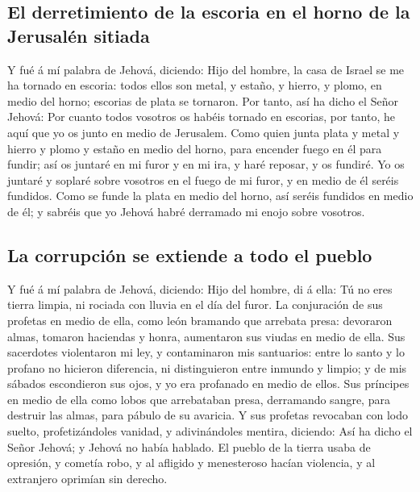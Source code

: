 \hypertarget{el-derretimiento-de-la-escoria-en-el-horno-de-la-jerusaluxe9n-sitiada}{%
\subsection{El derretimiento de la escoria en el horno de la Jerusalén
sitiada}\label{el-derretimiento-de-la-escoria-en-el-horno-de-la-jerusaluxe9n-sitiada}}

 Y fué á mí palabra de Jehová, diciendo:  Hijo
del hombre, la casa de Israel se me ha tornado en escoria: todos ellos
son metal, y estaño, y hierro, y plomo, en medio del horno; escorias de
plata se tornaron.  Por tanto, así ha dicho el Señor
Jehová: Por cuanto todos vosotros os habéis tornado en escorias, por
tanto, he aquí que yo os junto en medio de Jerusalem.  Como
quien junta plata y metal y hierro y plomo y estaño en medio del horno,
para encender fuego en él para fundir; así os juntaré en mi furor y en
mi ira, y haré reposar, y os fundiré.  Yo os juntaré y
soplaré sobre vosotros en el fuego de mi furor, y en medio de él seréis
fundidos.  Como se funde la plata en medio del horno, así
seréis fundidos en medio de él; y sabréis que yo Jehová habré derramado
mi enojo sobre vosotros.

\hypertarget{la-corrupciuxf3n-se-extiende-a-todo-el-pueblo}{%
\subsection{La corrupción se extiende a todo el
pueblo}\label{la-corrupciuxf3n-se-extiende-a-todo-el-pueblo}}

 Y fué á mí palabra de Jehová, diciendo:  Hijo
del hombre, di á ella: Tú no eres tierra limpia, ni rociada con lluvia
en el día del furor.  La conjuración de sus profetas en
medio de ella, como león bramando que arrebata presa: devoraron almas,
tomaron haciendas y honra, aumentaron sus viudas en medio de ella.
 Sus sacerdotes violentaron mi ley, y contaminaron mis
santuarios: entre lo santo y lo profano no hicieron diferencia, ni
distinguieron entre inmundo y limpio; y de mis sábados escondieron sus
ojos, y yo era profanado en medio de ellos.  Sus príncipes
en medio de ella como lobos que arrebataban presa, derramando sangre,
para destruir las almas, para pábulo de su avaricia.  Y sus
profetas revocaban con lodo suelto, profetizándoles vanidad, y
adivinándoles mentira, diciendo: Así ha dicho el Señor Jehová; y Jehová
no había hablado.  El pueblo de la tierra usaba de
opresión, y cometía robo, y al afligido y menesteroso hacían violencia,
y al extranjero oprimían sin derecho.


